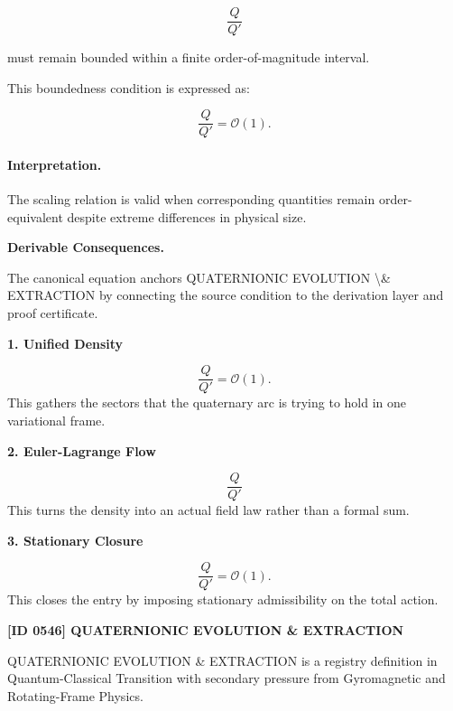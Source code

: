 \begin{equation}
\frac{Q}{Q'}
\end{equation}

must remain bounded within a finite order-of-magnitude interval.

This boundedness condition is expressed as:

\begin{equation}
\boxed{
\frac{Q}{Q'}
=
\mathcal{O}(1).
}
\end{equation}

\paragraph{Interpretation.}
The scaling relation is valid when corresponding quantities remain order-equivalent despite extreme differences in physical size.

\par\vspace{0.35em}
\noindent\textbf{Derivable Consequences.}\quad
\begingroup
\footnotesize
\raggedright
The canonical equation anchors QUATERNIONIC EVOLUTION \textbackslash{}\& EXTRACTION by connecting the source condition to the derivation layer and proof certificate.
\par\endgroup

\noindent\textbf{1. Unified Density}\par
\[
\frac{Q}{Q'} = \mathcal{O}(1).
\]
\noindent This gathers the sectors that the quaternary arc is trying to hold in one variational frame.\par
\noindent\textbf{2. Euler-Lagrange Flow}\par
\[
\frac{Q}{Q'}
\]
\noindent This turns the density into an actual field law rather than a formal sum.\par
\noindent\textbf{3. Stationary Closure}\par
\[
\boxed{ \frac{Q}{Q'} = \mathcal{O}(1). }
\]
\noindent This closes the entry by imposing stationary admissibility on the total action.\par

\clearpage
\noindent\textbf{[ID 0546] QUATERNIONIC EVOLUTION \& EXTRACTION}\par
\vspace{0.35em}
\begingroup\small
{}
QUATERNIONIC EVOLUTION \& EXTRACTION is a registry definition in Quantum-Classical Transition with secondary pressure from Gyromagnetic and Rotating-Frame Physics.

